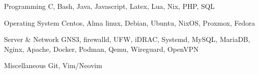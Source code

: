 

\begin{cvskills}

  \cvskill
    {Programming} %
    {C, Bash, Java, Javascript, Latex, Lua, Nix, PHP, SQL} %

  \cvskill
    {Operating System} %
    {Centos, Alma linux, Debian, Ubuntu, NixOS, Proxmox,
    Fedora} %

  \cvskill
    {Server \& Network} %
    {GNS3, firewalld, UFW, iDRAC, Systemd, MySQL, MariaDB,
    Nginx, Apache, Docker, Podman, Qemu, Wireguard, OpenVPN} %

  \cvskill
    {Miscellaneous} %
    {Git, Vim/Neovim} %

\end{cvskills}
